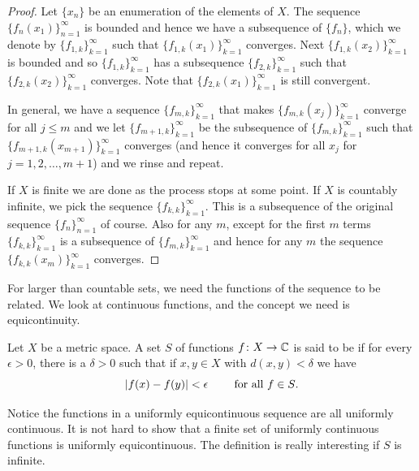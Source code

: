 \begin{proof}
Let $\{ x_n \}$ be an enumeration of the elements of $X$.
The sequence $\{ f_n(x_1) \}_{n=1}^\infty$ is bounded and hence
we have a subsequence of $\{ f_n \}$, which we denote by
$\{ f_{1,k} \}_{k=1}^\infty$
such that
$\{ f_{1,k}(x_1) \}_{k=1}^\infty$ converges.
Next $\{ f_{1,k}(x_2) \}_{k=1}^\infty$ is bounded and so 
$\{ f_{1,k} \}_{k=1}^\infty$ has a subsequence
$\{ f_{2,k} \}_{k=1}^\infty$ such that
$\{ f_{2,k}(x_2) \}_{k=1}^\infty$ converges.  Note that
$\{ f_{2,k}(x_1) \}_{k=1}^\infty$ is still convergent.

In general, we have a sequence $\{ f_{m,k}
\}_{k=1}^\infty$
that makes $\{ f_{m,k}(x_j) \}_{k=1}^\infty$ converge for all $j \leq m$ and we 
let $\{ f_{m+1,k} \}_{k=1}^\infty$ be the subsequence of $\{ f_{m,k}
\}_{k=1}^\infty$
such that
$\{ f_{m+1,k}(x_{m+1}) \}_{k=1}^\infty$ converges (and hence it converges for all
$x_j$ for $j=1,2,\ldots,m+1$) and we rinse and repeat.

If $X$ is finite we are done as the process stops at some point.
If $X$ is countably infinite,
we pick the sequence
$\{ f_{k,k} \}_{k=1}^\infty$.
This is a subsequence of the original sequence $\{ f_n \}_{n=1}^\infty$
of course.  Also for any $m$,
except for the first $m$ terms $\{ f_{k,k} \}_{k=1}^\infty$ is a subsequence of $\{ f_{m,k}
\}_{k=1}^\infty$
and hence for any $m$ the sequence $\{ f_{k,k}(x_m) \}_{k=1}^\infty$ converges.
\end{proof}

For larger than countable sets,
we need the functions of the sequence to be related.  We look at
continuous functions, and the concept we need is equicontinuity.

\begin{defn}
Let $X$ be a metric space.
A set $S$ of functions
$f \colon X \to {\mathbb{C}}$ is said to be
\emph{}
if for every $\epsilon > 0$, there is a $\delta > 0$
such that if $x,y \in X$ with $d(x,y) < \delta$ we have
\begin{equation*}
\lvert {f(x)-f(y)} \rvert < \epsilon \qquad \text{ for all $f \in S$} .
\end{equation*}
\end{defn}

Notice the functions in a uniformly equicontinuous sequence are
all uniformly continuous.  It is 
not hard to show that a finite set of uniformly continuous functions
is uniformly equicontinuous.  The definition is really interesting
if $S$ is infinite.

